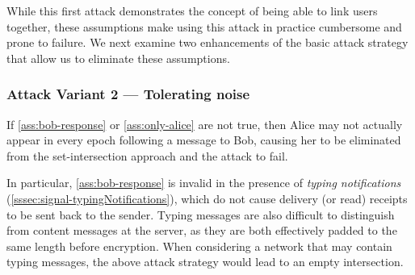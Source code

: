

While this first attack demonstrates the concept of being able to link users
together, these assumptions make using this attack in practice cumbersome and
prone to failure. We next examine two enhancements of the basic attack
strategy that allow us to eliminate these assumptions.

\subsubsection{Attack Variant 2 --- Tolerating noise}
\label{sec:signal-attack2}

If \cref{ass:bob-response} or \cref{ass:only-alice} are not true, then
Alice may not actually appear in every epoch following a message to Bob,
causing her to be eliminated from the set-intersection approach and the
attack to fail.

In particular, \cref{ass:bob-response} is invalid in the presence of
\emph{typing notifications} (\cref{sssec:signal-typingNotifications}), which
do not cause delivery (or read)
receipts to be sent back to the sender. Typing messages are also difficult to
distinguish from content messages at the server, as they are both effectively
padded to the same length before encryption. When considering a network that may
contain typing messages, the above attack strategy would lead to an empty
intersection.

